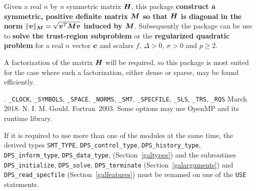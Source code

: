 \documentclass{galahad}
\newcommand{\packagename}{DPS}
\newcommand{\fullpackagename}{\libraryname\_\packagename}
\begin{document}
\galheader


\galsummary
Given a real $n$ by $n$ symmetric matrix ${\bm{H}}$, this package {\bf construct a
symmetric, positive definite matrix ${\bm{M}}$ so that ${\bm{H}}$
is diagonal in the norm $\|{\bm{v}}\|_{{\bm{M}}} = \sqrt{{\bm{v}}^T {\bm{M}} {\bm{v}}}$
induced by ${\bm{M}}$}. Subsequently the package can be use to
{\bf solve the trust-region subproblem}
or the {\bf regularized quadratic problem}
for a real $n$ vector ${\bm{c}}$ and scalars $f$, $\Delta>0$, $\sigma>0$
and $p \geq 2$.

\noindent
A factorization of the matrix ${\bm{H}}$ will be required, so this package is
most suited for the case where such a factorization, either dense or sparse,
may be found efficiently.


\galattributes
\galversions{\tt  \fullpackagename\_single, \fullpackagename\_double}.
\galuses
{\tt \libraryname\_CLOCK},
{\tt \libraryname\_SY\-M\-BOLS},
{\tt \libraryname\_SPACE}, {\tt \libraryname\_\-NORMS},
{\tt \libraryname\_\-SMT},
{\tt \libraryname\_\-SPECFILE},
{\tt \libraryname\_SLS}, {\tt \libraryname\_TRS},
{\tt \libraryname\_RQS}
\galdate March 2018.
\galorigin N. I. M. Gould.
\gallanguage Fortran~2003.
\galparallelism Some options may use OpenMP and its runtime library.


\galhowto



\noindent
If it is required to use more than one of the modules at the same time, 
the derived types
{\tt SMT\_TYPE},
{\tt \packagename\_control\_type},
{\tt \packagename\_history\_\-type},
{\tt \packagename\_inform\_type},
{\tt \packagename\_data\_type},
(Section~\ref{galtypes})
and the subroutines
{\tt \packagename\_initialize},
{\tt \packagename\_solve}, {\tt \packagename\_\-terminate}
(Section~\ref{galarguments})
and
{\tt \packagename\_read\_specfile}
(Section~\ref{galfeatures})
must be renamed on one of the {\tt USE} statements.

\end{document}
